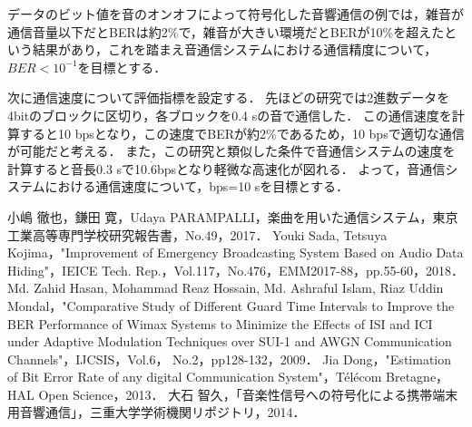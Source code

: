 \documentclass[a4j,11pt,dvipdfmx]{jsarticle}
\begin{document}
データのビット値を音のオンオフによって符号化した音響通信の例では，雑音が通信音量以下だとBERは約2\%で，雑音が大きい環境だとBERが10\%を超えたという結果があり\cite{ref:mobile_sound}，これを踏まえ音通信システムにおける通信精度について，$BER<10^{-1}$を目標とする．
\par
次に通信速度について評価指標を設定する．
先ほどの研究\cite{ref:mobile_sound}では2進数データを4bitのブロックに区切り，各ブロックを0.4 sの音で通信した．
この通信速度を計算すると10 bpsとなり，この速度でBERが約2\%であるため，10 bpsで適切な通信が可能だと考える．
また，この研究と類似した条件で音通信システムの速度を計算すると音長0.3 sで10.$\dot{6}$bpsとなり軽微な高速化が図れる．
よって，音通信システムにおける通信速度について，bps=10 sを目標とする．
\begin{thebibliography}{99}



  小嶋 徹也，鎌田 寛，Udaya PARAMPALLI，楽曲を用いた通信システム，東京工業高等専門学校研究報告書，No.49，2017．
  Youki Sada, Tetsuya Kojima，"Improvement of Emergency Broadcasting System Based on Audio Data Hiding"，IEICE Tech. Rep.，Vol.117，No.476，EMM2017-88，pp.55-60，2018．
  Md. Zahid Hasan, Mohammad Reaz Hossain, Md. Ashraful Islam, Riaz Uddin Mondal，"Comparative Study of Different Guard Time Intervals to Improve the BER Performance of Wimax Systems to Minimize the Effects of ISI
  and ICI under Adaptive Modulation Techniques over SUI-1 and AWGN Communication Channels"，IJCSIS，Vol.6， No.2，pp128-132，2009．
  Jia Dong，"Estimation of Bit Error Rate of any digital Communication System"，Télécom Bretagne，HAL Open Science，2013．
  大石 智久，「音楽性信号への符号化による携帯端末用音響通信」，三重大学学術機関リポジトリ，2014．
\end{thebibliography}
\end{document}
